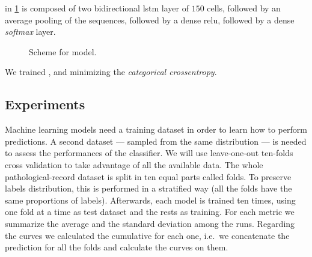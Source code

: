 \lstmb{} in \cref{fig:schemeLstmb} is composed of two bidirectional
\ac{lstm} layer of 
$150$ cells, followed by an average pooling of the sequences,
followed by a dense \ac{relu}, followed by a dense \emph{softmax}
layer. 
\begin{figure}
  \centering
  \caption{Scheme for \lstmb{} model.}
  \label{fig:schemeLstmb}
\end{figure}

We trained \lstmng{}, \lstmc{} and \lstmb{} minimizing
the \emph{categorical crossentropy}.

\subsection{Experiments}
\label{sec:experiments}
Machine learning models need a training dataset in order to learn how
to perform predictions. A second dataset — sampled from the same
distribution — is needed to assess the performances of the
classifier. We will use leave-one-out ten-folds cross validation
to take advantage of all the available data. The whole
pathological-record dataset is split in ten equal parts called
folds. To preserve labels distribution, this is performed in a
stratified way (all the folds have the same proportions of
labels). Afterwards, each
model is trained ten times, using one fold at a time as test
dataset and the rests as training. For each metric we summarize the
average and the standard deviation among the runs. Regarding the
curves we calculated the cumulative for each 
one, i.e.\ we concatenate the prediction for all the folds and
calculate the curves on them. 


